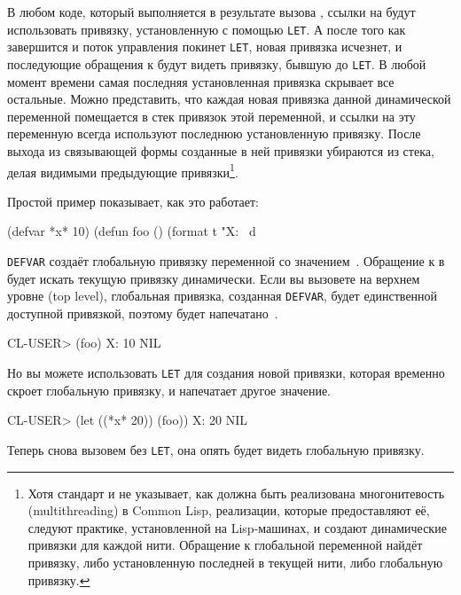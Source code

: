 В любом коде, который выполняется в результате вызова , ссылки на 
будут использовать привязку, установленную с помощью \lstinline{LET}. А после того как 
завершится и поток управления покинет \lstinline{LET}, новая привязка 
исчезнет, и последующие обращения к  будут видеть привязку, бывшую до
\lstinline{LET}. В любой момент времени самая последняя установленная привязка скрывает все
остальные. Можно представить, что каждая новая привязка данной динамической переменной
помещается в стек привязок этой переменной, и ссылки на эту переменную всегда используют
последнюю установленную привязку. После выхода из связывающей формы созданные в ней
привязки убираются из стека, делая видимыми предыдующие привязки\footnote{Хотя стандарт и
  не указывает, как должна быть реализована многонитевость (multithreading) в Common Lisp,
  реализации, которые предоставляют её, следуют практике, установленной на Lisp-машинах, и
  создают динамические привязки для каждой нити. Обращение к глобальной переменной найдёт
  привязку, либо установленную последней в текущей нити, либо глобальную привязку.}.

Простой пример показывает, как это работает:

\begin{myverb}
  (defvar *x* 10)
  (defun foo () (format t "X: ~d~%
\end{myverb}

\lstinline{DEFVAR} создаёт глобальную привязку переменной  со значением~. Обращение к
 в  будет искать текущую привязку динамически. Если вы вызовете  на верхнем
уровне (top level), глобальная привязка, созданная \lstinline{DEFVAR}, будет
единственной доступной привязкой, поэтому будет напечатано~.

\begin{myverb}
  CL-USER> (foo)
  X: 10
  NIL
\end{myverb}

Но вы можете использовать \lstinline{LET} для создания новой привязки, которая временно
скроет глобальную привязку, и  напечатает другое значение.

\begin{myverb}
  CL-USER> (let ((*x* 20)) (foo))
  X: 20
  NIL
\end{myverb}

Теперь снова вызовем  без \lstinline{LET}, она опять будет видеть глобальную
привязку.

